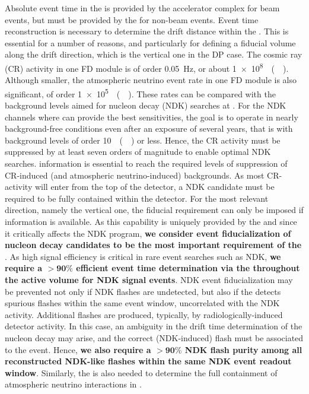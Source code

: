Absolute event time in the   is provided by the accelerator complex for beam events, but must be provided by the  for non-beam events. Event time reconstruction is necessary to determine the drift distance within the . This is essential for a number of reasons, and particularly for defining a fiducial volume along the  drift direction, which is the vertical one in the DP case. The cosmic ray (CR) activity in one FD module is of order \SI{0.05}{\Hz}, or about \SI{1e8}{\per(\Mtyr)}. Although smaller, the atmospheric neutrino event rate in one FD module is also significant, of order \SI{1e5}{\per(\Mtyr)}. These rates can be compared with the background levels aimed for nucleon decay (NDK) searches at . For the NDK channels where  can provide the best sensitivities, the goal is to operate in nearly background-free conditions even after an exposure of several years, that is with background levels of order \SI{10}{\per(\Mtyr)} or less. Hence, the CR activity must be suppressed by at least seven orders of magnitude to enable optimal NDK searches.  information is essential to reach the required levels of suppression of CR-induced (and atmospheric neutrino-induced) backgrounds. As most CR-activity will enter from the top of the detector, a NDK candidate must be required to be fully contained within the detector. For the most relevant direction, namely the vertical one, the fiducial requirement can only be imposed if  information is available. As this capability is uniquely provided by the  and since it critically affects the NDK program, {\bf we consider event fiducialization of nucleon decay candidates to be the most important requirement of the }. As high signal efficiency is critical in rare event searches such as NDK, {\bf we require a $\boldsymbol{>90\%}$ efficient event time determination via the  throughout the  active volume for NDK signal events}. NDK event fiducialization may be prevented not only if NDK flashes are undetected, but also if the  detects spurious flashes within the same event window, uncorrelated with the NDK activity. Additional flashes are produced, typically, by radiologically-induced detector activity. In this case, an ambiguity in the drift time determination of the nucleon decay may arise, and the correct (NDK-induced) flash must be associated to the event. Hence, {\bf we also require a $\boldsymbol{>90\%}$ NDK flash purity among all reconstructed NDK-like flashes within the same NDK event readout window}. Similarly, the  is also needed to determine the full containment of atmospheric neutrino interactions in .
 
